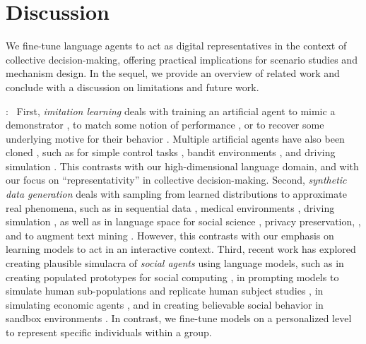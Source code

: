 \section{Discussion}\label{sec:5}
We fine-tune language agents to act as digital representatives in the context of collective decision-making, offering practical implications for scenario studies and mechanism design. In the sequel, we provide an overview of related work and conclude with a discussion on limitations and future work.


:~ First, \textit{imitation learning} deals with training an artificial agent to mimic a demonstrator \cite{le2016smooth,yue2018imitation,osa2018imitation,huyuk2021explaining},
to match some notion of performance
\cite{syed2010reduction,abbeel2004apprenticeship,neu2007apprenticeship,babes2011apprenticeship}, or
to recover some underlying motive for their behavior
\cite{ziebart2008maximum,finn2016guided,ho2016generative,jarrett2021inverse}.
Multiple artificial agents have also been cloned \cite{zhan2018generative,codevilla2019exploring}, such as for
simple control tasks \cite{song2018multi},
bandit environments \cite{shih2022conditional}, and
driving simulation \cite{bhattacharyya2018multi}.
This contrasts with our high-dimensional language domain, and with our focus on ``representativity'' in collective decision-making.
Second, \textit{synthetic data generation} deals with sampling from learned distributions to approximate real phenomena, such as in sequential data
\cite{lin2019generating,xu2020cot,jarrett2021time},
medical environments
\cite{chan2021medkit,rcgan},
driving simulation
\cite{dosovitskiy2017carla},
as well as in language space
for social science
\cite{veselovsky2023generating},
privacy preservation,
\cite{kurakin2023harnessing},
and to augment
text mining
\cite{tang2023does}.
However, this contrasts with our emphasis on learning models to act in an interactive context.
Third, recent work has explored creating plausible simulacra of \textit{social agents} using language models, such as
in creating populated prototypes for social computing
\cite{park2022social},
in prompting models to simulate human sub-populations
\cite{argyle2023out}
and replicate human subject studies
\cite{aher2023using,harding2023ai},
in simulating economic agents
\cite{horton2023large},
and in creating believable social behavior in sandbox environments
\cite{park2023generative}.
In contrast, we fine-tune models on a personalized level to represent specific individuals within a group.

